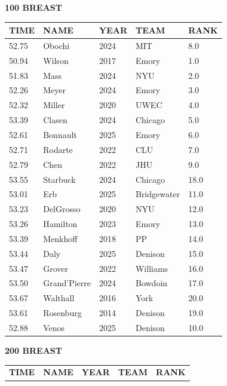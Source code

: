\begin{table}[H]
\centering
\begin{minipage}[t]{0.48\textwidth}
\centering
\textbf{100 BREAST}\\[0.1cm]
\begin{tabular}{@{}p{1.8cm}p{2.8cm}p{1.2cm}p{1.4cm}p{0.8cm}@{}}
\hline
    \textbf{TIME} & \textbf{NAME} & \textbf{YEAR} & \textbf{TEAM} & \textbf{RANK} \\
\hline
    52.75 & Obochi & 2024 & MIT & 8.0 \\
    50.94 & Wilson & 2017 & Emory & 1.0 \\
    51.83 & Mass & 2024 & NYU & 2.0 \\
    52.26 & Meyer & 2024 & Emory & 3.0 \\
    52.32 & Miller & 2020 & UWEC & 4.0 \\
    53.39 & Clasen & 2024 & Chicago & 5.0 \\
    52.61 & Bonnault & 2025 & Emory & 6.0 \\
    52.71 & Rodarte & 2022 & CLU & 7.0 \\
    52.79 & Chen & 2022 & JHU & 9.0 \\
    53.55 & Starbuck & 2024 & Chicago & 18.0 \\
    53.01 & Erb & 2025 & Bridgewater & 11.0 \\
    53.23 & DelGrosso & 2020 & NYU & 12.0 \\
    53.26 & Hamilton & 2023 & Emory & 13.0 \\
    53.39 & Menkhoff & 2018 & PP & 14.0 \\
    53.44 & Daly & 2025 & Denison & 15.0 \\
    53.47 & Grover & 2022 & Williams & 16.0 \\
    53.50 & Grand'Pierre & 2024 & Bowdoin & 17.0 \\
    53.67 & Walthall & 2016 & York & 20.0 \\
    53.61 & Rosenburg & 2014 & Denison & 19.0 \\
    52.88 & Venos & 2025 & Denison & 10.0 \\
\hline
\end{tabular}
\end{minipage}\hfill
\begin{minipage}[t]{0.48\textwidth}
\centering
\textbf{200 BREAST}\\[0.1cm]
\begin{tabular}{@{}p{1.8cm}p{2.8cm}p{1.2cm}p{1.4cm}p{0.8cm}@{}}
\hline
    \textbf{TIME} & \textbf{NAME} & \textbf{YEAR} & \textbf{TEAM} & \textbf{RANK} \\

\end{tabular}
\end{minipage}
\end{table}
